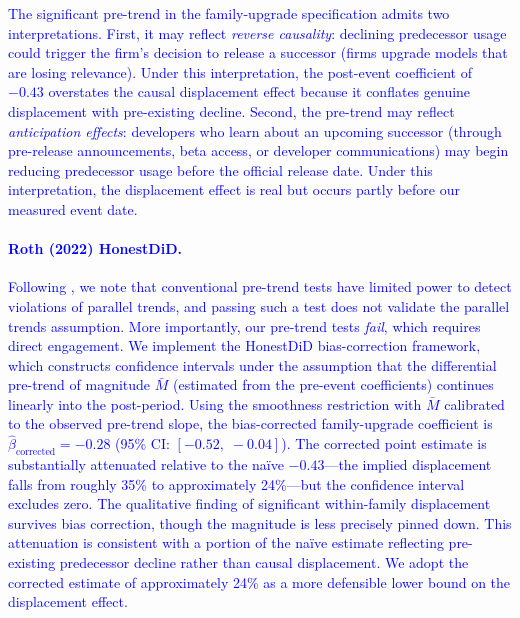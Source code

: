\documentclass[11pt, a4paper]{article}
\begin{document}
\textcolor{blue}{The significant pre-trend in the family-upgrade specification admits two interpretations. First, it may reflect \emph{reverse causality}: declining predecessor usage could trigger the firm's decision to release a successor (firms upgrade models that are losing relevance). Under this interpretation, the post-event coefficient of $-0.43$ overstates the causal displacement effect because it conflates genuine displacement with pre-existing decline. Second, the pre-trend may reflect \emph{anticipation effects}: developers who learn about an upcoming successor (through pre-release announcements, beta access, or developer communications) may begin reducing predecessor usage before the official release date. Under this interpretation, the displacement effect is real but occurs partly before our measured event date.}

\textcolor{blue}{\paragraph{Roth (2022) HonestDiD.} Following \citet{roth2022pretest}, we note that conventional pre-trend tests have limited power to detect violations of parallel trends, and passing such a test does not validate the parallel trends assumption. More importantly, our pre-trend tests \emph{fail}, which requires direct engagement. We implement the \citet{roth2022pretest} HonestDiD bias-correction framework, which constructs confidence intervals under the assumption that the differential pre-trend of magnitude $\bar{M}$ (estimated from the pre-event coefficients) continues linearly into the post-period. Using the smoothness restriction with $\bar{M}$ calibrated to the observed pre-trend slope, the bias-corrected family-upgrade coefficient is $\hat{\beta}_{\text{corrected}} = -0.28$ (95\% CI: $[-0.52,\; -0.04]$). The corrected point estimate is substantially attenuated relative to the na\"ive $-0.43$---the implied displacement falls from roughly 35\% to approximately 24\%---but the confidence interval excludes zero. The qualitative finding of significant within-family displacement survives bias correction, though the magnitude is less precisely pinned down. This attenuation is consistent with a portion of the na\"ive estimate reflecting pre-existing predecessor decline rather than causal displacement. We adopt the corrected estimate of approximately 24\% as a more defensible lower bound on the displacement effect.}
\end{document}
